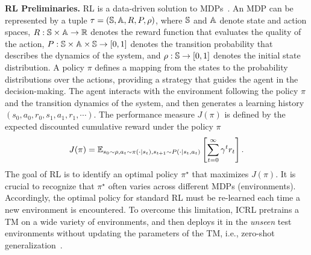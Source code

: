 \documentclass{article}
\def\Real{\mathbb{R}}
\begin{document}
\textbf{RL Preliminaries.}
%
RL is a data-driven solution to MDPs~\citep{sutton2018reinforcement}. 
An MDP can be represented by a tuple $\tau = ({\mathbb S}, {\mathbb A}, R, P, \rho)$, where ${\mathbb S}$ and ${\mathbb A}$ denote state and action spaces, $R: \mbS \times \mbA \to \Real$ denotes the reward function that evaluates the quality of the action, $P: {\mathbb S} \times {\ensuremath{\mathbb A}} \times {\ensuremath{\mathbb S}} \to [0, 1]$ denotes the transition probability that describes the dynamics of the system, and $\rho: {\mathbb S} \to [0, 1]$ denotes the initial state distribution.  
%
A policy $\pi$ defines a mapping from the states to the probability distributions over the actions, providing a strategy that guides the agent in the decision-making.
%
The agent interacts with the environment following the policy $\pi$ and the transition dynamics of the system, and then generates a learning history $(s_0, a_0, r_0, s_1, a_1, r_1, \cdots)$.
%
The performance measure $J (\pi)$ is defined by the expected discounted cumulative reward under the policy $\pi$
\begin{align}
    J (\pi) = {\mathbb E}_{s_0 \sim \rho, a_t \sim \pi(\cdot | s_t), s_{t+1} \sim P(\cdot|s_t, a_t)} \left[ \sum_{t=0}^\infty \gamma^t r_t \right].
\end{align}
%
The goal of RL is to identify an optimal policy $\pi^\star$ that maximizes $J (\pi)$.
%
It is crucial to recognize that $\pi^\star$ often varies across different MDPs (environments). Accordingly, the optimal policy for standard RL must be re-learned each time a new environment is encountered.
%
%
To overcome this limitation, ICRL pretrains a TM on a wide variety of environments, and then deploys it in the \textit{unseen} test environments without updating the parameters of the TM, i.e., zero-shot generalization~\citep{sohn2018hierarchical, mazoure2022improving, zisselman2023explore, kirk2023survey}.






\end{document}
